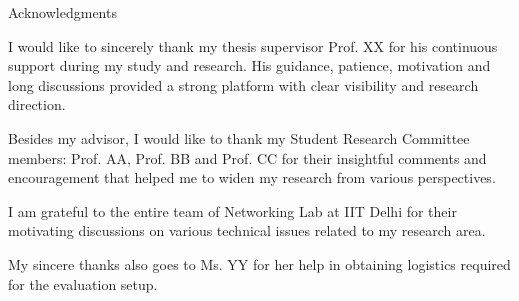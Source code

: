 \begin{center}
\LARGE{Acknowledgments} 
\end{center}

\vspace{0.5in}

\setlength{\parindent}{1.0em}

I would like to sincerely thank my thesis supervisor Prof. XX for his continuous support during my study and research. His guidance, patience, motivation and long discussions provided a strong platform with clear visibility and research direction.

Besides my advisor, I would like to thank my Student Research Committee members: Prof. AA, Prof. BB and Prof. CC for their insightful comments and encouragement that helped me to widen my research from various perspectives.

I am grateful to the entire team of Networking Lab at IIT Delhi for their motivating discussions on various technical issues related to my research area.

My sincere thanks also goes to Ms. YY for her help in obtaining logistics required for the evaluation setup.

\vspace{0.8in}


{\bfseries \Auth}



